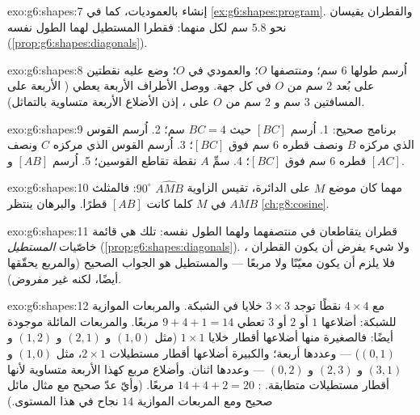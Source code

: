 \begin{solution}{exo:g6:shapes:7}
إنشاء بالعموديات، كما في \cref{ex:g6:shapes:program}.
والقطران يقيسان نحو $5.8$ سم لكل منهما: فقطرا المستطيل
لهما الطول نفسه (\cref{prop:g6:shapes:diagonals}).
\end{solution}

\begin{solution}{exo:g6:shapes:8}
اُرسم  طولها $6$ سم؛ ومنتصفها $O$؛ والعمودي في $O$؛
وضع عليه نقطتين على بُعد $2$ سم من $O$ في كل جهة. ووصل الأطراف
الأربعة يعطي  ( الأربعة على المسافتين
$3$ سم و $2$ سم من $O$ على  ، إذن الأضلاع الأربعة
متساوية بالتماثل).
\end{solution}

\begin{solution}{exo:g6:shapes:9}
برنامج صحيح:
1. اُرسم  $[BC]$ حيث $BC = 4$ سم؛
2. اُرسم القوس الذي مركزه $B$ ونصف قطره $6$ سم فوق $[BC]$؛
3. اُرسم القوس الذي مركزه $C$ ونصف قطره $6$ سم فوق $[BC]$؛
4. سمِّ $A$ نقطة تقاطع القوسين؛
5. اُرسم  $[AB]$ و $[AC]$.
\end{solution}

\begin{solution}{exo:g6:shapes:10}
مهما كان موضع $M$ على الدائرة، تقيس الزاوية $\widehat{AMB}$
$90^\circ$: فالمثلث $AMB$  في $M$
كلما كانت $[AB]$ قطرًا. والبرهان ينتظر
\cref{ch:g8:cosine}.
\end{solution}

\begin{solution}{exo:g6:shapes:11}
قطران يتقاطعان في منتصفهما ولهما الطول نفسه:
تلك هي قائمة خاصّيات \emph{المستطيل}
(\cref{prop:g6:shapes:diagonals}). ولا شيء يفرض أن يكون القطران
، فلا يلزم أن يكون معيّنًا ولا مربعًا --- والمستطيل
هو الجواب الصحيح (والمربع يحقّقها أيضًا، لكنه غير
مفروض).
\end{solution}

\begin{solution}{exo:g6:shapes:12}
مع $4 \times 4$ نقطًا توجد $3 \times 3$ خلايا في الشبكة.
والمربعات الموازية للشبكة: أضلاعها $1$ أو $2$ أو $3$ تعطي $9 + 4 + 1 = 14$
مربعًا. والمربعات المائلة موجودة أيضًا: فالصغيرة منها أضلاعها
أقطار خلايا $1 \times 1$ (مثل $(1,0)$ و $(2,1)$ و $(1,2)$ و
$(0,1)$) --- وعددها أربعة؛ والكبيرة أضلاعها
أقطار مستطيلات $2 \times 1$، مثل $(1,0)$ و $(3,1)$ و $(2,3)$ و
$(0,2)$ --- وعددها اثنان. وأضلاع مربع كهذا الأربعة متساوية
لأنها أقطار مستطيلات متطابقة. :
$14 + 4 + 2 = 20$ مربعًا. (وأيّ عدّ صحيح مع مثال مائل صحيح
ومع المربعات الموازية $14$ نجاح في هذا المستوى.)
\end{solution}

